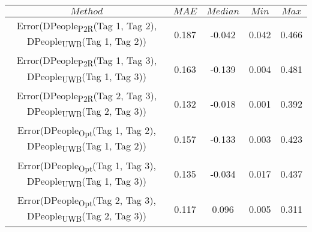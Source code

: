 \begin{table}[h]
\centering
{\small
\begin{tabular}{|c|c|c|c|c|}
\hline
$Method$ & $MAE$ & $Median$ & $Min$ & $Max$ \\
\hline
{\scriptsize Error(DPeople\textsubscript{P2R}(Tag 1, Tag 2), DPeople\textsubscript{UWB}(Tag 1, Tag 2))} & 0.187 & -0.042 & 0.042 & 0.466 \\
\hline
{\scriptsize Error(DPeople\textsubscript{P2R}(Tag 1, Tag 3), DPeople\textsubscript{UWB}(Tag 1, Tag 3))} & 0.163 & -0.139 & 0.004 & 0.481 \\
\hline
{\scriptsize Error(DPeople\textsubscript{P2R}(Tag 2, Tag 3), DPeople\textsubscript{UWB}(Tag 2, Tag 3))} & 0.132 & -0.018 & 0.001 & 0.392 \\
\hline
{\scriptsize Error(DPeople\textsubscript{Opt}(Tag 1, Tag 2), DPeople\textsubscript{UWB}(Tag 1, Tag 2))} & 0.157 & -0.133 & 0.003 & 0.423 \\
\hline
{\scriptsize Error(DPeople\textsubscript{Opt}(Tag 1, Tag 3), DPeople\textsubscript{UWB}(Tag 1, Tag 3))} & 0.135 & -0.034 & 0.017 & 0.437 \\
\hline
{\scriptsize Error(DPeople\textsubscript{Opt}(Tag 2, Tag 3), DPeople\textsubscript{UWB}(Tag 2, Tag 3))} & 0.117 & 0.096 & 0.005 & 0.311 \\
\hline
\end{tabular}
}
\end{table}
